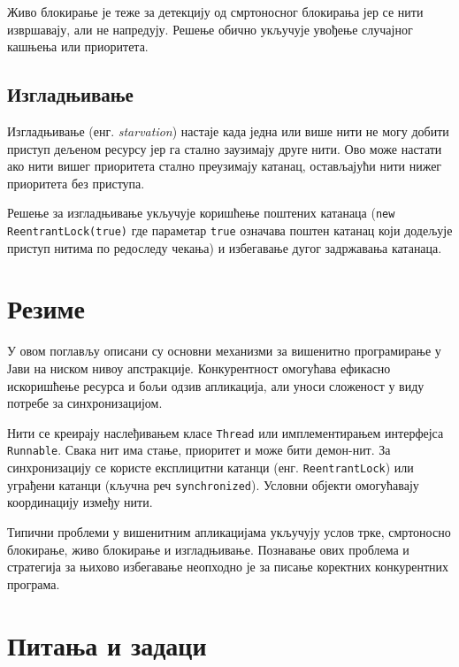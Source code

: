 Живо блокирање је теже за детекцију од смртоносног блокирања јер се нити извршавају, али не напредују. Решење обично укључује увођење случајног кашњења или приоритета.


\subsection{Изгладњивање}

Изгладњивање (енг. \textit{starvation}) настаје када једна или више нити не могу добити приступ дељеном ресурсу јер га стално заузимају друге нити. Ово може настати ако нити вишег приоритета стално преузимају катанац, остављајући нити нижег приоритета без приступа.

Решење за изгладњивање укључује коришћење поштених катанаца (\texttt{new ReentrantLock(true)} где параметар \texttt{true} означава поштен катанац који додељује приступ нитима по редоследу чекања) и избегавање дугог задржавања катанаца.


\section{Резиме}

У овом поглављу описани су основни механизми за вишенитно програмирање у Јави на ниском нивоу апстракције. Конкурентност омогућава ефикасно искоришћење ресурса и бољи одзив апликација, али уноси сложеност у виду потребе за синхронизацијом.

Нити се креирају наслеђивањем класе \texttt{Thread} или имплементирањем интерфејса \texttt{Runnable}. Свака нит има стање, приоритет и може бити демон-нит. За синхронизацију се користе експлицитни катанци (енг. \texttt{ReentrantLock}) или уграђени катанци (кључна реч \texttt{synchronized}). Условни објекти омогућавају координацију између нити.

Типични проблеми у вишенитним апликацијама укључују услов трке, смртоносно блокирање, живо блокирање и изгладњивање. Познавање ових проблема и стратегија за њихово избегавање неопходно је за писање коректних конкурентних програма.


\section{Питања и задаци}

